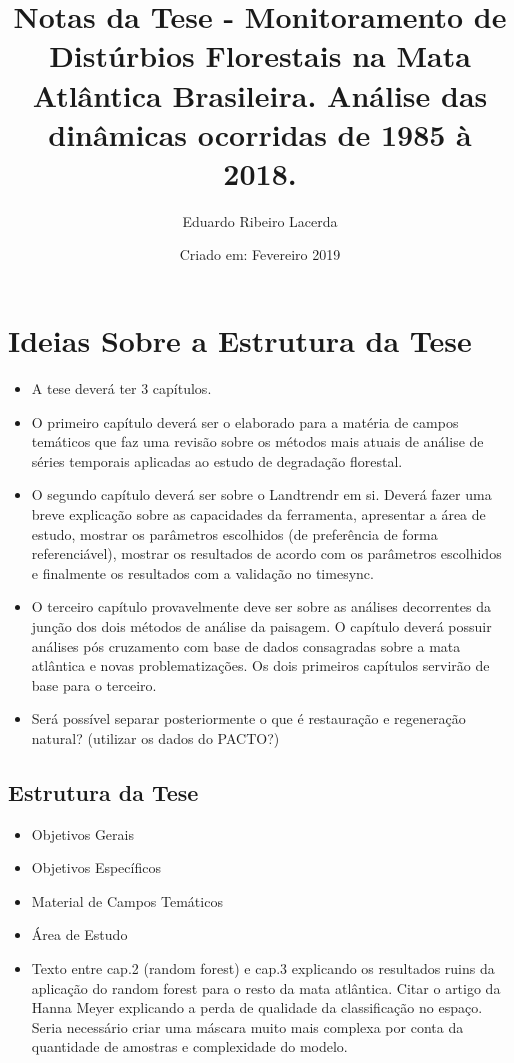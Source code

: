 \documentclass{article}
\title{Notas da Tese - Monitoramento de Distúrbios Florestais na Mata Atlântica Brasileira. Análise das dinâmicas ocorridas de 1985 à 2018.}
\author{Eduardo Ribeiro Lacerda }
\date{Criado em: Fevereiro 2019}
\begin{document}
\maketitle

\section{Ideias Sobre a Estrutura da Tese}
\begin{itemize}
    \item A tese deverá ter 3 capítulos.
    
    \item O primeiro capítulo deverá ser o elaborado para a matéria de campos temáticos que faz uma revisão sobre os métodos mais atuais de análise de séries temporais aplicadas ao estudo de degradação florestal.
    
    \item O segundo capítulo deverá ser sobre o Landtrendr em si. Deverá fazer uma breve explicação sobre as capacidades da ferramenta, apresentar a área de estudo, mostrar os parâmetros escolhidos (de preferência de forma referenciável), mostrar os resultados de acordo com os parâmetros escolhidos e finalmente os resultados com a validação no timesync.
    
    \item O terceiro capítulo provavelmente deve ser sobre as análises decorrentes da junção dos dois métodos de análise da paisagem. O capítulo deverá possuir análises pós cruzamento com base de dados consagradas sobre a mata atlântica e novas problematizações. Os dois primeiros capítulos servirão de base para o terceiro. 
    
    \item Será possível separar posteriormente o que é restauração e regeneração natural? (utilizar os dados do PACTO?)
\end{itemize}

\subsection{Estrutura da Tese}

\begin{itemize}
    \item Objetivos Gerais 
    
    \item Objetivos Específicos
    
    \item Material de Campos Temáticos
    
    \item Área de Estudo
    
    \item Texto entre cap.2 (random forest) e cap.3 explicando os resultados ruins da aplicação do random forest para o resto da mata atlântica. Citar o artigo da Hanna Meyer explicando a perda de qualidade da classificação no espaço. Seria necessário criar uma máscara muito mais complexa por conta da quantidade de amostras e complexidade do modelo.
    
\end{itemize}
\end{document}
